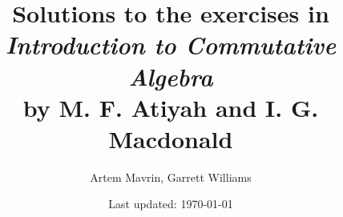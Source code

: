 \usepackage{defs}

\title{\texorpdfstring{%
Solutions to the exercises in\\
\emph{Introduction to Commutative Algebra}\\
by M. F. Atiyah and I. G. Macdonald}%
{Atiyah-Macdonald Solutions}}
\author{Artem Mavrin, Garrett Williams}
\date{Last updated: \today}


